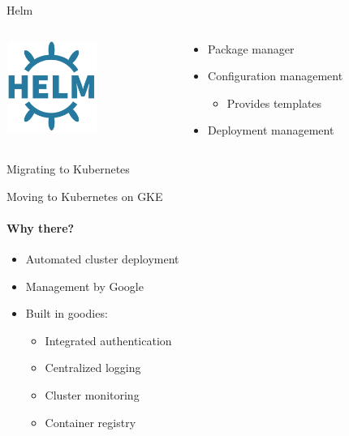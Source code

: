 \documentclass[17pt]{beamer}
\newcommand{\imageframe}[2]{{
  \usebackgroundtemplate{\texttt{[image: \#1]}}
  \begin{frame}{
    \vspace{-6pt}\usebeamercolor[fg]{item}
    \pgfsetfillopacity{0.8}
    \begin{snugshade}
    \centering #2
    \end{snugshade}
  }
  \end{frame}
}}
\begin{document}
  \begin{frame}{Helm}
    \begin{columns}[c]
      \begin{column}{.2\textwidth}
          \includegraphics[width=3cm,height=3cm]{images/helm_logo.png}
      \end{column}
      \begin{column}{.8\textwidth}
        \begin{itemize}
          \item Package manager
          \item Configuration management
          \begin{itemize}
            \item Provides templates
          \end{itemize}
          \item Deployment management
        \end{itemize}
      \end{column}
    \end{columns}
  \end{frame}


  \imageframe{images/migrating_cranes.jpg}{Migrating to Kubernetes}

  \begin{frame}{Moving to Kubernetes on GKE}
  \framesubtitle{Why there?}
  \begin{itemize}
    \item<1-> Automated cluster deployment
    \item<2-> Management by Google
    \item<3-> Built in goodies:
    \begin{itemize}
      \item Integrated authentication
      \item Centralized logging
      \item Cluster monitoring
      \item Container registry
    \end{itemize}
  \end{itemize}
  \end{frame}
\end{document}
